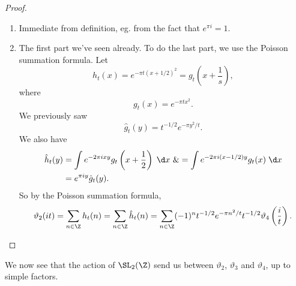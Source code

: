 \documentclass[a4paper]{article}
\begin{document}
\begin{proof}\leavevmode
  \begin{enumerate}
    \item Immediate from definition, eg. from the fact that $e^{\pi i} = 1$.
    \item The first part we've seen already. To do the last part, we use the Poisson summation formula. Let
      \[
        h_t(x) = e^{-\pi t(x + 1/2)^2} = g_t\left(x + \frac{1}{s}\right),
      \]
      where
      \[
        g_t(x) = e^{-\pi tx^2}.
      \]
      We previously saw
      \[
        \hat{g}_t(y) = t^{-1/2} e^{-\pi y^2/t}.
      \]
      We also have
      \begin{align*}
        \hat{h}_t(y) &= \int e^{-2\pi i xy} g_t\left(x + \frac{1}{2}\right)\;\d x \
        \&= \int e^{-2\pi i (x - 1/2) y} g_t(x) \;\d x \\
        &= e^{\pi i y} \hat{g}_t(y).
      \end{align*}
      So by the Poisson summation formula,
      \[
        \vartheta_2(it) = \sum_{n \in \Z} h_t(n) = \sum_{n \in \Z} \hat{h}_t(n) = \sum_{n \in \Z} (-1)^n t^{-1/2} e^{-\pi n^2/t} t^{-1/2} \vartheta_4 \left(\frac{i}{t}\right).
      \]
  \end{enumerate}
\end{proof}

We now see that the action of $\SL_2(\Z)$ send us between $\vartheta_2$, $\vartheta_3$ and $\vartheta_4$, up to simple factors.
\end{document}
